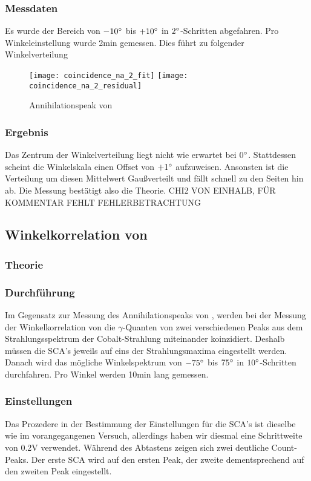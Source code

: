 \documentclass{../Misc/MontavonLaTeX/Montavon}
\newcommand{\halfwidth}{0.48\textwidth}
\begin{document}
\subsubsection{Messdaten}
Es wurde der Bereich von $-10 ^{\circ}$ bis $+10 ^{\circ}$ in $2 ^{\circ}$-Schritten abgefahren. Pro Winkeleinstellung wurde 2min gemessen. 
Dies führt zu folgender Winkelverteilung

\begin{figure}[htbp]
\texttt{[image: coincidence\_na\_2\_fit]}
\texttt{[image: coincidence\_na\_2\_residual]}
\caption{Annihilationspeak von }
\label{fig:NA22}
\end{figure}

\subsubsection{Ergebnis}
Das Zentrum der Winkelverteilung liegt nicht wie erwartet bei $0 ^{\circ}$. Stattdessen scheint die Winkelskala einen Offset von $+1 ^{\circ}$ aufzuweisen. Ansonsten ist die Verteilung um diesen Mittelwert Gaußverteilt und fällt schnell zu den Seiten hin ab. 
Die Messung bestätigt also die Theorie. CHI2 VON EINHALB, FÜR KOMMENTAR FEHLT FEHLERBETRACHTUNG

\subsection{Winkelkorrelation von }
\subsubsection{Theorie}
\subsubsection{Durchführung}
Im Gegensatz zur Messung des Annihilationspeaks von , werden bei der Messung der Winkelkorrelation von  die $\gamma$-Quanten von zwei verschiedenen Peaks aus dem Strahlungsspektrum der Cobalt-Strahlung miteinander koinzidiert. Deshalb müssen die SCA's jeweils auf eins der Strahlungsmaxima eingestellt werden. Danach wird das mögliche Winkelspektrum von 
$-75 ^{\circ}$ bis $75 ^{\circ}$ in $10 ^{\circ}$-Schritten durchfahren. Pro Winkel werden 10min lang gemessen. 
\subsubsection{Einstellungen}
Das Prozedere in der Bestimmung der Einstellungen für die SCA's ist dieselbe wie im vorangegangenen Versuch, allerdings haben wir diesmal eine Schrittweite von 0.2V verwendet. Während des Abtastens zeigen sich zwei deutliche Count-Peaks. Der erste SCA wird auf den ersten Peak, der zweite dementsprechend auf den zweiten Peak eingestellt. 
\end{document}
